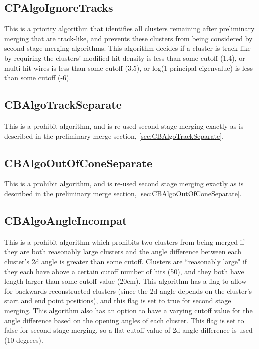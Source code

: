 \documentclass{article}
\begin{document}
\subsection{CPAlgoIgnoreTracks}\label{sec:CPAlgoIgnoreTracks}
This is a priority algorithm that identifies all clusters remaining after preliminary merging that are track-like, and
prevents these clusters from being considered by second stage merging algorithms. This algorithm decides if a cluster is
track-like by requiring the clusters' modified hit density is less than some cutoff (1.4), or multi-hit-wires is less 
than some cutoff (3.5), or log(1-principal eigenvalue) is less than some cutoff (-6).

\subsection{CBAlgoTrackSeparate}
This is a prohibit algorithm, and is re-used second stage merging exactly as is described in the preliminary merge section,
\autoref{sec:CBAlgoTrackSeparate}.

\subsection{CBAlgoOutOfConeSeparate}
This is a prohibit algorithm, and is re-used second stage merging exactly as is described in the preliminary merge section,
\autoref{sec:CBAlgoOutOfConeSeparate}.

\subsection{CBAlgoAngleIncompat}\label{sec:CBAlgoAngleIncompat}
This is a prohibit algorithm which prohibits two clusters from being merged if they are both reasonably large clusters and 
the angle difference between each cluster's 2d angle is greater than some cutoff. Clusters are ``reasonably large" if they
each have above a certain cutoff number of hits (50), and they both have length larger than some cutoff value (20cm). This
algorithm has a flag to allow for backwards-reconstructed clusters (since the 2d angle depends on the cluster's start and
end point positions), and this flag is set to true for second stage merging. This algorithm also has an option to have a 
varying cutoff value for the angle difference based on the opening angles of each cluster. This flag is set to false for 
second stage merging, so a flat cutoff value of 2d angle difference is used (10 degrees).
\end{document}
